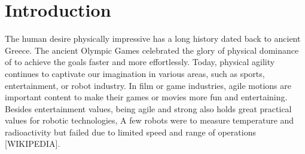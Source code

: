 \chapter{Introduction}

The human desire  physically impressive has a long history
dated back to ancient Greece.
The ancient Olympic Games celebrated the glory of physical dominance of
 to achieve the goals
faster and more effortlessly. 
Today, physical agility continues to captivate our imagination in
various areas, such as sports, entertainment, or robot industry.
In film or game industries, agile motions are important content to make
their games or movies more fun and entertaining.
Besides entertainment values, being agile and strong also holds great practical
values for robotic technologies,
A few robots were  to
measure temperature and radioactivity but failed due to limited speed and range
of operations [WIKIPEDIA].


